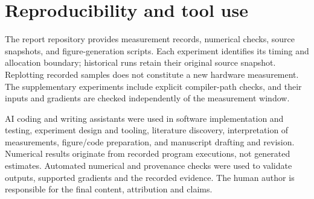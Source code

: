 \section*{Reproducibility and tool use}
The report repository provides measurement records, numerical checks, source
snapshots, and figure-generation scripts. Each experiment identifies its timing
and allocation boundary; historical runs retain their original source snapshot.
Replotting recorded samples does not constitute a new hardware measurement.
The supplementary experiments include explicit compiler-path checks, and their
inputs and gradients are checked independently of the measurement window.

AI coding and writing assistants were used in software implementation and
testing, experiment design and tooling, literature discovery, interpretation
of measurements, figure/code preparation, and manuscript drafting and revision.
Numerical results originate from recorded program executions, not generated
estimates. Automated numerical and provenance checks were used to validate
outputs, supported gradients and the recorded evidence. The human author is
responsible for the final content, attribution and claims.

